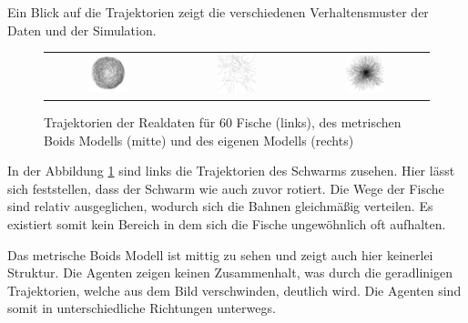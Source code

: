 Ein Blick auf die Trajektorien zeigt die verschiedenen Verhaltensmuster der Daten und der Simulation.

\begin{figure}[H]
\centering
\begin{tabular}{ccc}
\includegraphics[width=0.33\textwidth]{figures/Experimente/Realdaten/Fisch_60_REAL.png} &
\includegraphics[width=0.33\textwidth]{figures/Experimente/Realdaten/Boids_60_Fisch.png} &
\includegraphics[width=0.33\textwidth]{figures/Experimente/Realdaten/PWD_60_Fisch_sim.png} 
\end{tabular}
\caption{Trajektorien der Realdaten für 60 Fische (links), des metrischen Boids Modells (mitte) und des eigenen Modells (rechts)\label{fig:60FischTraj}}
\end{figure}

In der Abbildung \ref{fig:60FischTraj} sind links die Trajektorien des Schwarms zusehen. Hier lässt sich feststellen, dass der Schwarm wie auch zuvor rotiert. Die Wege der Fische sind relativ ausgeglichen, wodurch sich die Bahnen gleichmäßig verteilen.
Es existiert somit kein Bereich in dem sich die Fische ungewöhnlich oft aufhalten.

Das metrische Boids Modell ist mittig zu sehen und zeigt auch hier keinerlei Struktur. Die Agenten zeigen keinen Zusammenhalt, was durch die geradlinigen Trajektorien, welche aus dem Bild verschwinden, deutlich wird. Die Agenten sind somit in unterschiedliche Richtungen unterwegs.

